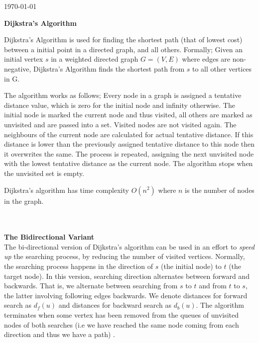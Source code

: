 \documentclass[paper=a4, fontsize=11pt]{scrartcl} %
\begin{document}
\begin{titlepage}

\vspace{5cm}

{\large \today}\\[3cm] %

\vfill %

\end{titlepage}
\clearpage
\onecolumn
\setlength{\parindent}{10ex}
{\bf \noindent Dijkstra's Algorithm}
{\par \noindent  Dijkstra's Algorithm is used for finding the shortest path (that of lowest cost) between a initial point in a directed graph, and all others. Formally; Given an initial vertex $s$ in a weighted directed graph $G = (V,E)$ where edges are non-negative, Dijkstra's Algorithm finds the shortest path from $s$ to all other vertices in G. 
\par The algorithm works as follows; Every node in a graph is assigned a tentative distance value, which is zero for the initial node and infinity otherwise. The initial node is marked the current node and thus visited, all others are marked as unvisited and are passed into a set. Visited nodes are not visited again. The neighbours of the current node are calculated for actual tentative distance. If this distance is lower than the previously assigned tentative distance to this node then it overwrites the same. The process is repeated, assigning the next unvisited node with the lowest tentative distance as the current node. The algorithm stops when the unvisited set is empty.
\par Dijkstra's algorithm has time complexity $O(n^2)$ where $n$ is the number of nodes in the graph. }\\\\
{\bf The Bidirectional Variant}\\
{The bi-directional version of Dijkstra's algorithm can be used in an effort to {\it speed up} the searching process, by reducing the number of visited vertices. Normally, the searching process happens in the direction of $s$ (the initial node) to $t$ (the target node). In this version, searching direction alternates between forward and backwards. That is, we alternate between searching from $s$ to $t$ and from $t$ to $s$, the latter involving following edges backwards. We denote distances for forward search as $d_f(u)$ and distances for backward search as $d_b(u)$. The algorithm terminates when some vertex has been removed from the queues of unvisited nodes of both searches (i.e we have reached the same node coming from each direction and thus we have a path) \cite{mit}.} \\\\
\end{document}
